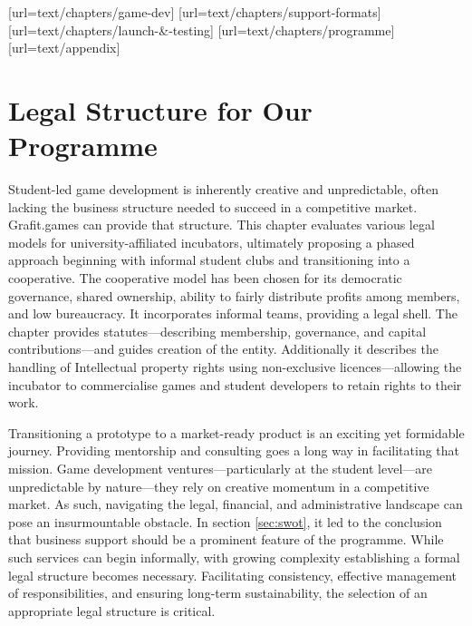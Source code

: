 [url=text/chapters/game-dev]
[url=text/chapters/support-formats]
[url=text/chapters/launch-&-testing]
[url=text/chapters/programme]
[url=text/appendix]
\chapter{Legal Structure for Our Programme}\label{chap:legal}

\begin{chapterabstract}	
    Student-led game development is inherently creative and unpredictable, often lacking the business structure needed to succeed in a competitive market. Grafit.games can provide that structure. This chapter evaluates various legal models for university-affiliated incubators, ultimately proposing a phased approach beginning with informal student clubs and transitioning into a cooperative. The cooperative model has been chosen for its democratic governance, shared ownership, ability to fairly distribute profits among members, and low bureaucracy. It incorporates informal teams, providing a legal shell. The chapter provides statutes—describing membership, governance, and capital contributions---and guides creation of the entity. Additionally it describes the handling of Intellectual property rights using non-exclusive licences---allowing the incubator to commercialise games and student developers to retain rights to their work.
\end{chapterabstract}

Transitioning a prototype to a market-ready product is an exciting yet formidable journey. Providing mentorship and consulting goes a long way in facilitating that mission. Game development ventures—particularly at the student level—are unpredictable by nature---they rely on creative momentum in a competitive market. As such, navigating the legal, financial, and administrative landscape can pose an insurmountable obstacle. In section \ref{sec:swot}, it led to the conclusion that business support should be a prominent feature of the programme. While such services can begin informally, with growing complexity establishing a formal legal structure becomes necessary. Facilitating consistency, effective management of responsibilities, and ensuring long-term sustainability, the selection of an appropriate legal structure is critical.

